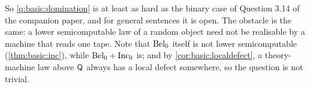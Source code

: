 So \cref{q:basic:domination} is at least as hard as the binary case of Question 3.14 of the companion paper, and for general sentences it is open. The obstacle is the same: a lower semicomputable law of a random object need not be realisable by a machine that reads one tape. Note that $\mathrm{Bel}_0$ itself is not lower semicomputable (\cref{thm:basic:inc}), while $\mathrm{Bel}_0+\mathrm{Inc}_0$ is; and by \cref{cor:basic:localdefect}, a theory-machine law above $\mathsf{Q}$ always has a local defect somewhere, so the question is not trivial.
